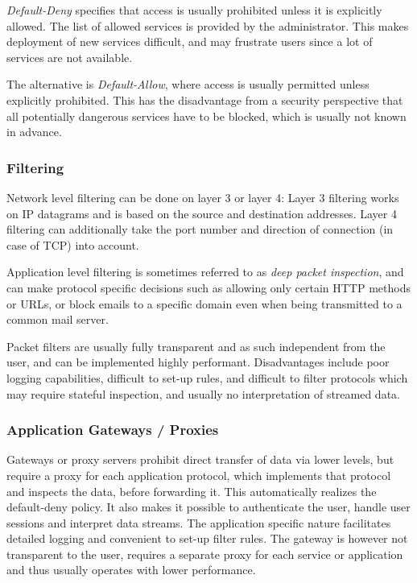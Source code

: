 \emph{Default-Deny} specifies that access is usually prohibited unless it is
explicitly allowed. The list of allowed services is provided by the
administrator. This makes deployment of new services difficult, and may
frustrate users since a lot of services are not available.

The alternative is \emph{Default-Allow}, where access is usually permitted
unless explicitly prohibited. This has the disadvantage from a security
perspective that all potentially dangerous services have to be blocked, which is
usually not known in advance.

\subsubsection{Filtering}
Network level filtering can be done on layer 3 or layer 4: Layer 3 filtering
works on IP datagrams and is based on the source and destination addresses.
Layer 4 filtering can additionally take the port number and direction of
connection (in case of TCP) into account.

Application level filtering is sometimes referred to as \emph{deep packet
inspection}, and can make protocol specific decisions such as allowing only
certain HTTP methods or URLs, or block emails to a specific domain even when
being transmitted to a common mail server.

Packet filters are usually fully transparent and as such independent from the
user, and can be implemented highly performant. Disadvantages include poor
logging capabilities, difficult to set-up rules, and difficult to filter
protocols which may require stateful inspection, and usually no interpretation
of streamed data.

\subsubsection{Application Gateways / Proxies}
Gateways or proxy servers prohibit direct transfer of data via lower levels, but
require a proxy for each application protocol, which implements that protocol
and inspects the data, before forwarding it. This automatically realizes the
default-deny policy. It also makes it possible to authenticate the user, handle
user sessions and interpret data streams. The application specific nature
facilitates detailed logging and convenient to set-up filter rules. The gateway
is however not transparent to the user, requires a separate proxy for each
service or application and thus usually operates with lower performance.

